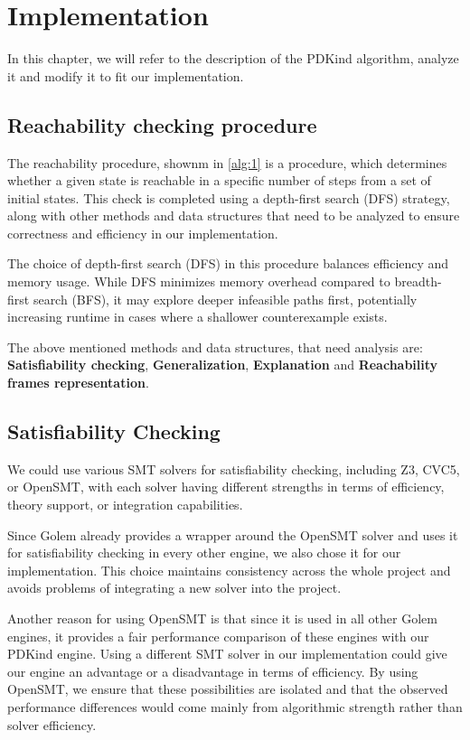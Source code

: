 \chapter{Implementation}
\noindent In this chapter, we will refer to the description of the PDKind algorithm, analyze it and modify it to fit our implementation.

\section{Reachability checking procedure}
The reachability procedure, shownm in \ref{alg:1} is a procedure, which determines whether a given state is reachable in a specific number of steps from a set of initial states. This check is completed using a depth-first search (DFS) strategy, along with other methods and data structures that need to be analyzed to ensure correctness and efficiency in our implementation.

The choice of depth-first search (DFS) in this procedure balances efficiency and memory usage. While DFS minimizes memory overhead compared to breadth-first search (BFS), it may explore deeper infeasible paths first, potentially increasing runtime in cases where a shallower counterexample exists.

The above mentioned methods and data structures, that need analysis are: \textbf{Satisfiability checking}, \textbf{Generalization}, \textbf{Explanation} and \textbf{Reachability frames representation}.
\section*{Satisfiability Checking}
\noindent We could use various SMT solvers for satisfiability checking, including Z3\cite{}, CVC5\cite{}, or OpenSMT\cite{OpenSMT}, with each solver having different strengths in terms of efficiency, theory support, or integration capabilities.

Since Golem already provides a wrapper around the OpenSMT solver and uses it for satisfiability checking in every other engine, we also chose it for our implementation. This choice maintains consistency across the whole project and avoids problems of integrating a new solver into the project.

Another reason for using OpenSMT is that since it is used in all other Golem engines, it provides a fair performance comparison of these engines with our PDKind engine. Using a different SMT solver in our implementation could give our engine an advantage or a disadvantage in terms of efficiency. By using OpenSMT, we ensure that these possibilities are isolated and that the observed performance differences would come mainly from algorithmic strength rather than solver efficiency.

